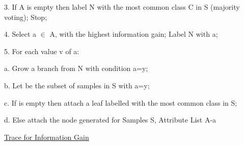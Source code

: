 \documentclass[12pt]{article}
\renewcommand{\_}{\kern-1.5pt\textunderscore\kern-1.5pt}
\begin{document}
3. If A is empty then label N with the most common class C in S (majority voting); Stop; \par

4. Select a \textcolor[HTML]{222222}{$ \in $ } A, with the highest information gain; Label N with a; \par

5. For each value v of a: \par

\begin{adjustwidth}{0.5in}{0.0in}
a. Grow a branch from N with condition a=y; \par

\end{adjustwidth}

\begin{adjustwidth}{0.5in}{0.0in}
b. Let be the subset of samples in S with a=y; \par

\end{adjustwidth}

\begin{adjustwidth}{0.5in}{0.0in}
c. If is empty then attach a leaf labelled with the most common class in S; \par

\end{adjustwidth}

\begin{adjustwidth}{0.5in}{0.0in}
d. Else attach the node generated for Samples S, Attribute List A-a\par

\end{adjustwidth}


\vspace{\baselineskip}

\vspace{\baselineskip}

\vspace{\baselineskip}
{\fontsize{14pt}{16.8pt}\selectfont \uline{Trace for Information Gain}\par}\par



\end{document}
